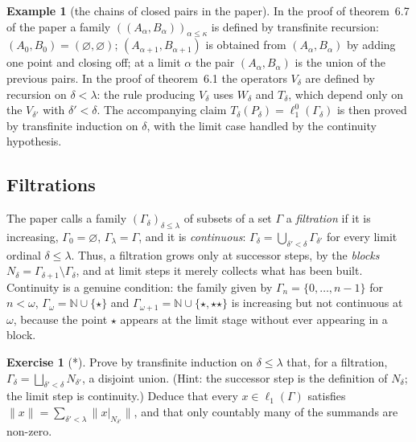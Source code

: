\documentclass[12pt]{article}
\theoremstyle{definition}
\newtheorem{example}[theorem]{Example}
\newtheorem{exercise}[theorem]{Exercise}
\theoremstyle{remark}
\newcommand{\lo}[1]{\ell_1^0(#1)}
\newcommand{\ellone}[1]{\ell_1(#1)}
\newcommand{\norm}[1]{\lVert #1\rVert}
\newcommand{\NN}{\mathbb{N}}
\begin{document}
\begin{example}[the chains of closed pairs in the paper] In the proof of
    theorem~6.7 of the paper a family ${((A_\alpha,B_\alpha))}_{\alpha\leq\kappa}$
    is defined by transfinite recursion: $(A_0,B_0)=(\varnothing,\varnothing)$;
    $(A_{\alpha+1},B_{\alpha+1})$ is obtained from $(A_\alpha,B_\alpha)$ by
    adding one point and closing off; at a limit $\alpha$ the pair
    $(A_\alpha,B_\alpha)$ is the union of the previous pairs. In the proof of
    theorem~6.1 the operators $V_\delta$ are defined by recursion on
    $\delta<\lambda$: the rule producing $V_\delta$ uses $W_\delta$ and
    $T_\delta$, which depend only on the $V_{\delta'}$ with $\delta'<\delta$.
    The accompanying claim $T_\delta(P_\delta)=\lo{\Gamma_\delta}$ is then
    proved by transfinite induction on $\delta$, with the limit case handled
    by the continuity hypothesis.
\end{example}

\subsection{Filtrations}

The paper calls a family ${(\Gamma_\delta)}_{\delta\leq\lambda}$ of subsets
of a set $\Gamma$ a \emph{filtration} if it is increasing,
$\Gamma_0=\varnothing$, $\Gamma_\lambda=\Gamma$, and it is \emph{continuous}:
$\Gamma_\delta=\bigcup_{\delta'<\delta}\Gamma_{\delta'}$ for every limit
ordinal $\delta\leq\lambda$. Thus, a filtration grows only at successor
steps, by the \emph{blocks} $N_\delta=\Gamma_{\delta+1}\setminus\Gamma_\delta$,
and at limit steps it merely collects what has been built. Continuity is a
genuine condition: the family given by $\Gamma_n=\{0,\ldots,n-1\}$ for
$n<\omega$, $\Gamma_\omega=\NN\cup\{\star\}$ and $\Gamma_{\omega+1}=\NN\cup\{\star,\star\star\}$
is increasing but not continuous at $\omega$, because the point $\star$
appears at the limit stage without ever appearing in a block.

\begin{exercise}[*] Prove by transfinite induction on $\delta\leq\lambda$ that,
    for a filtration, $\Gamma_\delta=\bigsqcup_{\delta'<\delta}N_{\delta'}$,
    a disjoint union. (Hint: the successor step is the definition of
    $N_\delta$; the limit step is continuity.) Deduce that every $x\in\ellone{\Gamma}$
    satisfies $\norm{x}=\sum_{\delta'<\lambda}\norm{x|_{N_{\delta'}}}$, and
    that only countably many of the summands are non-zero.
\end{exercise}
\end{document}

